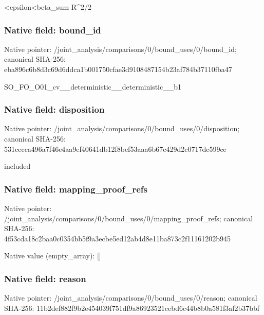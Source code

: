 \documentclass[10pt,a4paper]{article}
\begin{document}
\begingroup\raggedright{}<epsilon<beta\_\allowbreak{}sum R\textasciicircum{}2/\allowbreak{}2\par\endgroup

\subsubsection{Native field: bound\_\allowbreak{}id}
Native pointer: /joint\_\allowbreak{}analysis/comparisons/0/bound\_\allowbreak{}uses/0/bound\_\allowbreak{}id; canonical SHA-256: eba896c6b8d3c69d6ddca1b001750cfae3d9108487154b23af784b37110fba47

\begingroup\raggedright\sloppy SO\_\allowbreak{}FO\_\allowbreak{}O01\_\allowbreak{}cv\_\allowbreak{}\_\allowbreak{}deterministic\_\allowbreak{}\_\allowbreak{}deterministic\_\allowbreak{}\_\allowbreak{}b1\par\endgroup

\subsubsection{Native field: disposition}
Native pointer: /joint\_\allowbreak{}analysis/comparisons/0/bound\_\allowbreak{}uses/0/disposition; canonical SHA-256: 531cecca496a7f46e4aa9ef40641db12f8bef53aaa6b67c429d2c0717dc599ce

\begingroup\raggedright\sloppy included\par\endgroup

\subsubsection{Native field: mapping\_\allowbreak{}proof\_\allowbreak{}refs}
Native pointer: /joint\_\allowbreak{}analysis/comparisons/0/bound\_\allowbreak{}uses/0/mapping\_\allowbreak{}proof\_\allowbreak{}refs; canonical SHA-256: 4f53cda18c2baa0c0354bb5f9a3ecbe5ed12ab4d8e11ba873c2f11161202b945

Native value (empty\_\allowbreak{}array): []

\subsubsection{Native field: reason}
Native pointer: /joint\_\allowbreak{}analysis/comparisons/0/bound\_\allowbreak{}uses/0/reason; canonical SHA-256: 11b2def882f9b2e454039f751df9a86923521cebd6c44b8b0a581f3af2b37bbf
\end{document}
